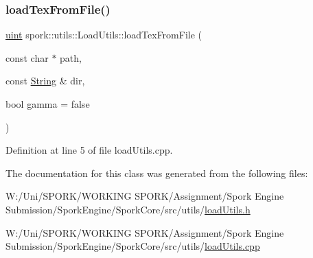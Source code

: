 \subsubsection{\texorpdfstring{load\+Tex\+From\+File()}{loadTexFromFile()}}
{\footnotesize\ttfamily \hyperlink{defines_8h_a91ad9478d81a7aaf2593e8d9c3d06a14}{uint} spork\+::utils\+::\+Load\+Utils\+::load\+Tex\+From\+File (\begin{DoxyParamCaption}\item[{const char $\ast$}]{path,  }\item[{const \hyperlink{my_string_8h_afbeda3fd1bdc8c37d01bdf9f5c8274ff}{String} \&}]{dir,  }\item[{bool}]{gamma = {\ttfamily false} }\end{DoxyParamCaption})}



Definition at line 5 of file load\+Utils.\+cpp.



The documentation for this class was generated from the following files\+:\begin{DoxyCompactItemize}
\item 
W\+:/\+Uni/\+S\+P\+O\+R\+K/\+W\+O\+R\+K\+I\+N\+G S\+P\+O\+R\+K/\+Assignment/\+Spork Engine Submission/\+Spork\+Engine/\+Spork\+Core/src/utils/\hyperlink{load_utils_8h}{load\+Utils.\+h}\item 
W\+:/\+Uni/\+S\+P\+O\+R\+K/\+W\+O\+R\+K\+I\+N\+G S\+P\+O\+R\+K/\+Assignment/\+Spork Engine Submission/\+Spork\+Engine/\+Spork\+Core/src/utils/\hyperlink{load_utils_8cpp}{load\+Utils.\+cpp}\end{DoxyCompactItemize}
